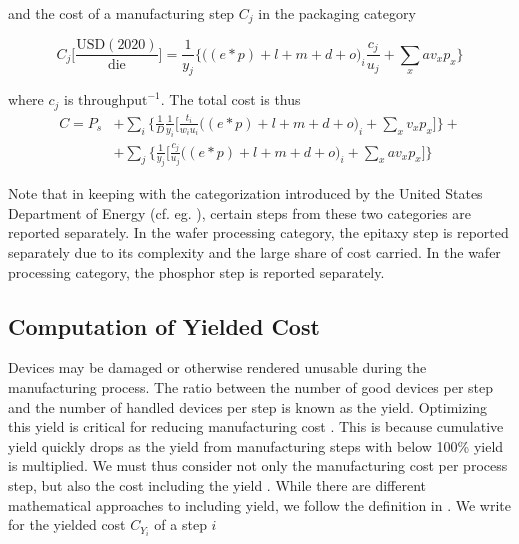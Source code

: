 \documentclass[10pt]{article}
\begin{document}
and the cost of a manufacturing step $C_j$ in the packaging category

\begin{equation}
\label{eqn:cost_die}
    C_j \bigg[ \frac{ \text{USD}(2020) }{ \text{die} } \bigg] = \frac{1}{y_j}  \bigg\{ \bigg((e*p) + l + m + d + o \bigg)_i  \frac{c_j}{u_j} + \sum_{x} a v_x p_x \bigg\}
\end{equation}

where $c_j$ is $\text{throughput}^{-1}$. The total cost is thus
\begin{equation}
\label{eqn:cost_total}
\begin{split}
    C= P_s &+ \sum_i \bigg \{ \frac{1}{D} \frac{1}{y_i} \bigg[ \frac{t_i}{w_i u_i} \bigg((e*p) + l + m + d +o \bigg)_i  + \sum_{x} v_x p_x \bigg] \bigg \} + \\
    & + \sum_j \bigg \{ \frac{1}{y_j} \bigg[ \frac{c_j}{u_j}  \bigg((e*p) + l + m + d + o \bigg)_i + \sum_{x} a v_x p_x \bigg ] \bigg\}
\end{split}
\end{equation}

Note that in keeping with the categorization introduced by the United States Department of Energy (cf. eg. \cite{doe_ssl_rnd_2019}), certain steps from these two categories are reported separately. In the wafer processing category, the epitaxy step is reported separately due to its complexity and the large share of cost carried. In the wafer processing category, the phosphor step is reported separately.

\subsection{Computation of Yielded Cost}

Devices may be damaged or otherwise rendered unusable during the manufacturing process. The ratio between the number of good devices per step and the number of handled devices per step is known as the yield. Optimizing this yield is critical for reducing manufacturing cost \cite{Kumar2006}. This is because cumulative yield quickly drops as the yield from manufacturing steps with below 100\% yield is multiplied. We must thus consider not only the manufacturing cost per process step, but also the cost including the yield \cite{becker2001use}\cite{becker2001using}. While there are different mathematical approaches to including yield, we follow the definition in \cite{becker2001use}. We write for the yielded cost $C_{Y_i}$ of a step $i$
\end{document}
